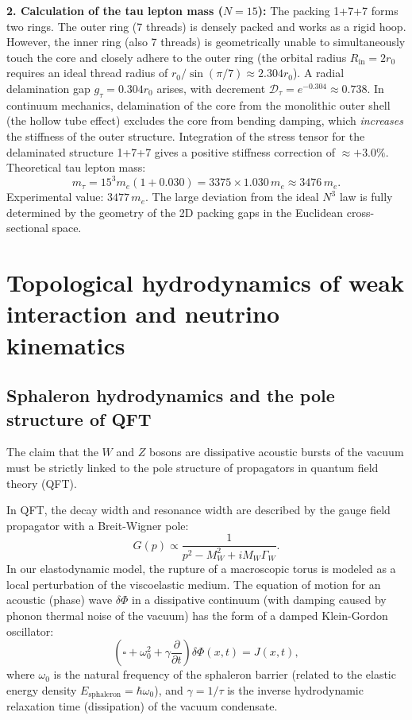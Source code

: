 \documentclass[11pt,a4paper]{article}
\begin{document}
\textbf{2. Calculation of the tau lepton mass ($N=15$):}
The packing 1+7+7 forms two rings. The outer ring (7 threads) is densely packed and works as a rigid hoop. However, the inner ring (also 7 threads) is geometrically unable to simultaneously touch the core and closely adhere to the outer ring (the orbital radius $R_{\text{in}} = 2r_0$ requires an ideal thread radius of $r_0 / \sin(\pi/7) \approx 2.304 r_0$). A radial delamination gap $g_\tau = 0.304 r_0$ arises, with decrement $\mathcal{D}_\tau = e^{-0.304} \approx 0.738$.
In continuum mechanics, delamination of the core from the monolithic outer shell (the hollow tube effect) excludes the core from bending damping, which \textit{increases} the stiffness of the outer structure. Integration of the stress tensor for the delaminated structure 1+7+7 gives a positive stiffness correction of $\approx +3.0\%$.
Theoretical tau lepton mass:
\begin{equation}
m_\tau = 15^3 m_e (1 + 0.030) = 3375 \times 1.030 \, m_e \approx 3476 \, m_e.
\end{equation}
Experimental value: $3477 \, m_e$. 
The large deviation from the ideal $N^3$ law is fully determined by the geometry of the 2D packing gaps in the Euclidean cross-sectional space.
		
\section{Topological hydrodynamics of weak interaction and neutrino kinematics}
	
\subsection{Sphaleron hydrodynamics and the pole structure of QFT}
The claim that the $W$ and $Z$ bosons are dissipative acoustic bursts of the vacuum must be strictly linked to the pole structure of propagators in quantum field theory (QFT).

In QFT, the decay width and resonance width are described by the gauge field propagator with a Breit-Wigner pole:
\begin{equation}
G(p) \propto \frac{1}{p^2 - M_W^2 + i M_W \Gamma_W}.
\end{equation}
In our elastodynamic model, the rupture of a macroscopic torus is modeled as a local perturbation of the viscoelastic medium. The equation of motion for an acoustic (phase) wave $\delta \Phi$ in a dissipative continuum (with damping caused by phonon thermal noise of the vacuum) has the form of a damped Klein-Gordon oscillator:
\begin{equation}
\left( \square + \omega_0^2 + \gamma \frac{\partial}{\partial t} \right) \delta \Phi(x,t) = J(x,t),
\end{equation}
where $\omega_0$ is the natural frequency of the sphaleron barrier (related to the elastic energy density $E_{\text{sphaleron}} = \hbar \omega_0$), and $\gamma = 1/\tau$ is the inverse hydrodynamic relaxation time (dissipation) of the vacuum condensate.
\end{document}
